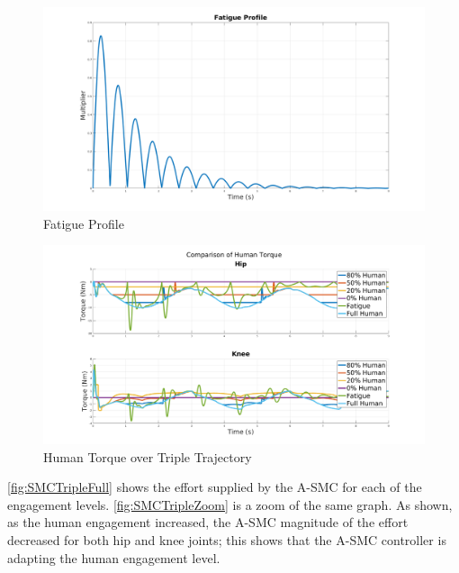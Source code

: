 \begin{figure}
    \centering
    \includegraphics[width=\columnwidth]{images/controllers/gait/fat_profile.png}
    \caption[Fatigue Profile]{Fatigue Profile}
    \label{fig:fatprofile}
\end{figure}


\begin{figure}
    \centering
    \includegraphics[width=\columnwidth]{images/controllers/trajs/human.png}
    \caption[Human Torque over Triple Trajectory]{Human Torque over Triple Trajectory}
    \label{fig:humantripletraj}
\end{figure}


\autoref{fig:SMCTripleFull} shows the effort supplied by the A-SMC for each of the engagement levels. \autoref{fig:SMCTripleZoom} is a zoom of the same graph. As shown, as the human engagement increased, the A-SMC magnitude of the effort decreased for both hip and knee joints; this shows that the A-SMC controller is adapting the human engagement level. 


